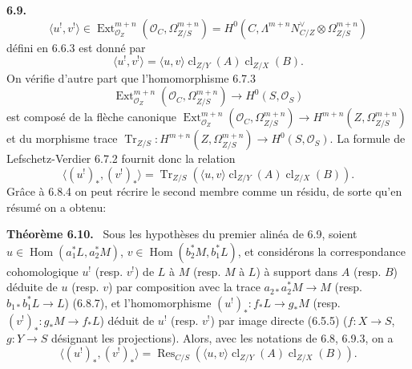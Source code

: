 \documentclass[11pt]{article}
\newenvironment{statement}[1]{\par\medskip\noindent\textbf{#1.}\ }{\par\medskip}
\DeclareMathOperator{\Hom}{Hom}
\DeclareMathOperator{\Ext}{Ext}
\providecommand{\cl}{\operatorname{cl}}
\providecommand{\Tr}{\operatorname{Tr}}
\providecommand{\OO}{\mathcal O}
\providecommand{\Res}{\operatorname{Res}}
\begin{document}
\begin{statement}{6.9}
\[
\langle u^!,v^!\rangle\in\Ext^{m+n}_{\OO_Z}(\OO_C,\Omega^{m+n}_{Z/S})=H^0(C,\Lambda^{m+n}N^\vee_{C/Z}\otimes\Omega^{m+n}_{Z/S})
\]
défini en 6.6.3 est donné par
\begin{equation}
\tag{6.9.4}
\langle u^!,v^!\rangle=\langle u,v\rangle\cl_{Z/Y}(A)\cl_{Z/X}(B).
\end{equation}
On vérifie d'autre part que l'homomorphisme 6.7.3
\[
\Ext^{m+n}_{\OO_Z}(\OO_C,\Omega^{m+n}_{Z/S})\longrightarrow H^0(S,\OO_S)
\]
est composé de la flèche canonique $\Ext^{m+n}_{\OO_Z}(\OO_C,\Omega^{m+n}_{Z/S})\to H^{m+n}(Z,\Omega^{m+n}_{Z/S})$ et du morphisme trace $\Tr_{Z/S}:H^{m+n}(Z,\Omega^{m+n}_{Z/S})\to H^0(S,\OO_S)$. La formule de Lefschetz-Verdier 6.7.2 fournit donc la relation
\begin{equation}
\tag{6.9.5}
\langle (u^!)_*,(v^!)_*\rangle=\Tr_{Z/S}(\langle u,v\rangle\cl_{Z/Y}(A)\cl_{Z/X}(B)).
\end{equation}
Grâce à 6.8.4 on peut récrire le second membre comme un résidu, de sorte qu'en résumé on a obtenu:
\end{statement}

\begin{statement}{Théorème 6.10}
Sous les hypothèses du premier alinéa de 6.9, soient $u\in\Hom(a_1^*L,a_2^*M)$, $v\in\Hom(b_2^*M,b_1^*L)$, et considérons la correspondance cohomologique $u^!$ (resp. $v^!$) de $L$ à $M$ (resp. $M$ à $L$) à support dans $A$ (resp. $B$) déduite de $u$ (resp. $v$) par composition avec la trace $a_{2*}a_2^*M\to M$ (resp. $b_{1*}b_1^*L\to L$) (6.8.7), et l'homomorphisme $(u^!)_*:f_*L\to g_*M$ (resp. $(v^!)_*:g_*M\to f_*L$) déduit de $u^!$ (resp. $v^!$) par image directe (6.5.5) ($f:X\to S$, $g:Y\to S$ désignant les projections). Alors, avec les notations de 6.8, 6.9.3, on a
\begin{equation}
\tag{6.10.1}
\langle (u^!)_*,(v^!)_*\rangle=\Res_{C/S}(\langle u,v\rangle\cl_{Z/Y}(A)\cl_{Z/X}(B)).
\end{equation}
\end{statement}
\end{document}
